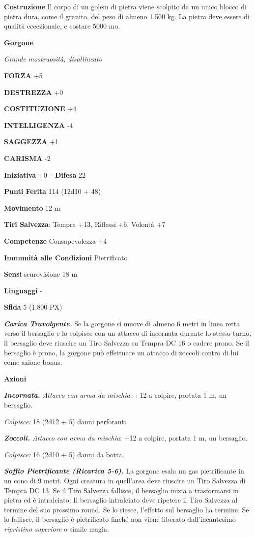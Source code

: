 \begin{multicols}{2}
\textbf{Costruzione}
Il corpo di un golem di pietra viene scolpito da un unico blocco di pietra dura, come il granito, del peso di almeno 1.500 kg. La pietra deve essere di qualità eccezionale, e costare 5000 mo.


\medskip{}\textbf{Gorgone}

\textit{Grande mostruosità, disallineato}

\textbf{FORZA} +5

\textbf{DESTREZZA} +0

\textbf{COSTITUZIONE} +4

\textbf{INTELLIGENZA} -4

\textbf{SAGGEZZA} +1

\textbf{CARISMA} -2

\textbf{Iniziativa} +0 -- \textbf{Difesa} 22

\textbf{Punti Ferita} 114 (12d10 + 48)

\textbf{Movimento} 12 m

\textbf{Tiri Salvezza}: Tempra +13, Riflessi +6, Volontà +7

\textbf{Competenze} Consapevolezza +4

\textbf{Immunità alle Condizioni} Pietrificato

\textbf{Sensi} scurovisione 18 m

\textbf{Linguaggi} -

\textbf{Sfida} 5 (1.800 PX)

\textit{\textbf{Carica Travolgente.}} Se la gorgone si muove di almeno 6 metri in linea retta verso il bersaglio e lo colpisce con un attacco di incornata durante lo stesso turno, il bersaglio deve riuscire un Tiro Salvezza su Tempra DC 16 o cadere prono. Se il bersaglio è prono, la gorgone può effettuare un attacco di zoccoli contro di lui come azione bonus.

\textbf{Azioni}

\textit{\textbf{Incornata.} Attacco con arma da mischia}: +12 a colpire, portata 1 m, un bersaglio.

\textit{Colpisce:} 18 (2d12 + 5) danni perforanti.

\textit{\textbf{Zoccoli.} Attacco con arma da mischia}: +12 a colpire, portata 1 m, un bersaglio.

\textit{Colpisce:} 16 (2d10 + 5) danni da botta.

\textit{\textbf{Soffio Pietrificante (Ricarica 5-6).}} La gorgone esala un gas pietrificante in un cono di 9 metri. Ogni creatura in quell'area deve riuscire un Tiro Salvezza di Tempra DC 13. Se il Tiro Salvezza fallisce, il bersaglio inizia a trasformarsi in pietra ed è intralciato. Il bersaglio intralciato deve ripetere il Tiro Salvezza al termine del suo prossimo round. Se lo riesce, l'effetto sul bersaglio ha termine. Se lo fallisce, il bersaglio è pietrificato finché non viene liberato dall'incantesimo \textit{ripristino superiore} o simile magia.


\end{multicols}
